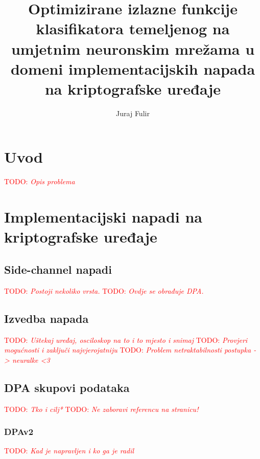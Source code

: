 \documentclass[times, utf8, numeric, diplomski]{fer}
\def\TODO#1{\noindent\textcolor{red}{TODO: \textit{#1}}\newline}
\def\todo#1{\TODO{#1}}
\begin{document}

\title{Optimizirane izlazne funkcije klasifikatora temeljenog na umjetnim neuronskim mrežama u domeni implementacijskih napada na kriptografske uređaje}

\author{Juraj Fulir}

\maketitle

\izvornik


\tableofcontents

\chapter{Uvod}
\todo{ Opis problema }

\chapter{Implementacijski napadi na kriptografske uređaje}

\section{Side-channel napadi}
\todo{ Postoji nekoliko vrsta.}
\todo{ Ovdje se obrađuje DPA.}

\section{Izvedba napada}
\todo{ Uštekaj uređaj, osciloskop na to i to mjesto i snimaj}
\todo{ Provjeri mogućnosti i zaključi najvjerojatniju}
\todo{ Problem netraktabilnosti postupka -> neuralke <3}

\section{DPA skupovi podataka}
\label{sec:dpa_datasets}
\todo{Tko i cilj*}
\todo{Ne zaboravi referencu na stranicu!}

\subsection{DPAv2}
\todo{Kad je napravljen i ko ga je radil}
\end{document}
